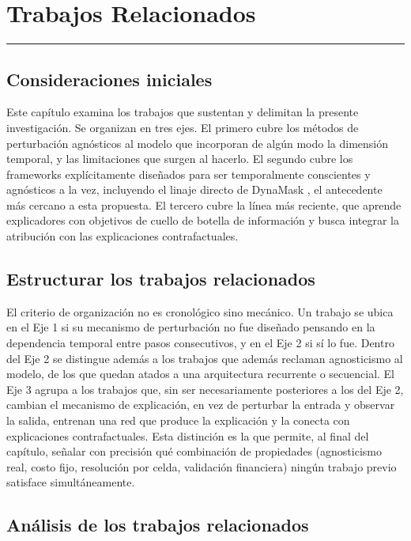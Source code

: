 \chapter{Trabajos Relacionados}
\hrule \bigskip \vspace*{1cm}
\label{sec:trabajosrelacionados}

\section{Consideraciones iniciales}

Este capítulo examina los trabajos que sustentan y delimitan la presente investigación. Se organizan en tres ejes. El primero cubre los métodos de perturbación agnósticos al modelo que incorporan de algún modo la dimensión temporal, y las limitaciones que surgen al hacerlo. El segundo cubre los frameworks explícitamente diseñados para ser temporalmente conscientes y agnósticos a la vez, incluyendo el linaje directo de DynaMask \cite{crabbe2021}, el antecedente más cercano a esta propuesta. El tercero cubre la línea más reciente, que aprende explicadores con objetivos de cuello de botella de información y busca integrar la atribución con las explicaciones contrafactuales.

\section{Estructurar los trabajos relacionados}

El criterio de organización no es cronológico sino mecánico. Un trabajo se ubica en el Eje 1 si su mecanismo de perturbación no fue diseñado pensando en la dependencia temporal entre pasos consecutivos, y en el Eje 2 si sí lo fue. Dentro del Eje 2 se distingue además a los trabajos que además reclaman agnosticismo al modelo, de los que quedan atados a una arquitectura recurrente o secuencial. El Eje 3 agrupa a los trabajos que, sin ser necesariamente posteriores a los del Eje 2, cambian el mecanismo de explicación, en vez de perturbar la entrada y observar la salida, entrenan una red que produce la explicación y la conecta con explicaciones contrafactuales. Esta distinción es la que permite, al final del capítulo, señalar con precisión qué combinación de propiedades (agnosticismo real, costo fijo, resolución por celda, validación financiera) ningún trabajo previo satisface simultáneamente.

\section{Análisis de los trabajos relacionados}

